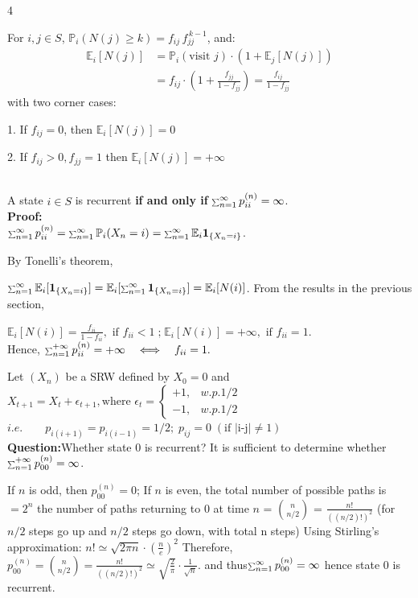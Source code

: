 \documentclass[a4paper, landscape]{article}
\newcommand{\subtopic}[1]{\par\textbf{#1}}
\newcommand{\smallsum}{\mathop{\scalebox{0.65}{$\sum$}}\nolimits}
\renewcommand{\subtopic}[1]{\par\textbf{\color{blue}{#1}}} %
\begin{document}
\begin{multicols}{4}
\subtopic{Fact for $f_{ij}$:} For $i,j\in S$,
$\mathbb P_i(N(j)\ge k)=f_{ij}\, f_{jj}^{\,k-1}$, and:
\begin{align*}
    \mathbb E_i[N(j)]&= \mathbb P_i(\text{visit }j)\cdot (1+\mathbb E_j[N(j)])\\
    &=f_{ij}\cdot(1+\frac{f_{jj}}{1-f_{jj}})=\frac{f_{ij}}{1-f_{jj}}
\end{align*}
with two corner cases:
\par 1. If $f_{ij}=0$, then $\mathbb E_i [N(j)]=0$
\par 2. If $f_{ij}>0, f_{jj}=1$ then $\mathbb E_i [N(j)]=+\infty$

\subtopic{Recurrent State Theorem:} \\A state $i\in S$ is recurrent \textbf{if and only if} $\smallsum_{n=1}^{\infty} p^{(n)}_{ii} = \infty$.\\
\textbf{Proof:}\\ $\smallsum_{n=1}^{\infty} p^{(n)}_{ii}=\smallsum_{n=1}^{\infty} \mathbb P_i(X_n=i)= \smallsum_{n=1}^{\infty} \mathbb E_i \mathbf{1}_{\{X_n=i\}}$.

By Tonelli's theorem,

$\smallsum_{n=1}^{\infty} \mathbb E_i [\mathbf{1}_{\{X_n=i\}}]
=\mathbb E_i [\smallsum_{n=1}^{\infty} \mathbf{1}_{\{X_n=i\}}]=\mathbb E_i[N(i)]$.
From the results in the previous section,

$\mathbb E_i[N(i)]=\frac{f_{ii}}{1-f_{ii}},\text{ if } f_{ii}<1\;\text{;}\;\mathbb E_i[N(i)] =+\infty, \text{ if } f_{ii}=1.$\\
Hence,
$\smallsum_{n=1}^{+\infty} p^{(n)}_{ii} = +\infty
\quad\Longleftrightarrow\quad
f_{ii}=1.$

\subtopic{1D SRW on $\mathbb Z$:}
Let $(X_n)$ be a SRW defined by $X_0=0$ and 
$X_{t+1}=X_t+\epsilon_{t+1}, \text{where } \epsilon_t=
\begin{cases}
+1,& w.p. 1/2\\
-1,& w.p. 1/2
\end{cases}
$\\
$i.e. \qquad p_{i(i+1)}=p_{i(i-1)}=1/2; \; p_{ij}=0\;(\text{if |i-j|}\neq1)$\\
\textbf{Question:}Whether state 0 is recurrent? It is sufficient to determine whether $\smallsum_{n=1}^{+\infty}p_{00}^{(n)}=\infty$.
\par If $n$ is odd, then $p^{(n)}_{00}=0$; If $n$ is even, the total number of possible paths is $=2^n$ the number of paths returning to $0$ at time $n$ = $\binom{n}{n/2}$ = $\frac{n!}{((n/2)!)^2}$ (for $n/2$ steps go up and $n/2$ steps go down, with total n steps)
Using Stirling's approximation: $ n!\simeq \sqrt{2\pi n}\cdot(\frac n e)^2$
Therefore,
$p_{00}^{(n)}=\binom{n}{n/2}=\frac{n!}{((n/2)!)^2} \simeq \sqrt{\frac2\pi}\cdot \frac{1}{\sqrt{n}}$.
and thus$\smallsum_{n=1}^{\infty} p^{(n)}_{00} = \infty$ hence state $0$ is recurrent.


\end{multicols}
\end{document}
